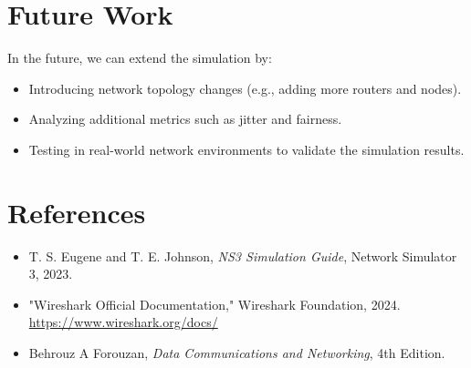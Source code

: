 \documentclass[a4paper,12pt]{article}
\begin{document}
	\section{Future Work}
	In the future, we can extend the simulation by:
	\begin{itemize}
		\item Introducing network topology changes (e.g., adding more routers and nodes).
		\item Analyzing additional metrics such as jitter and fairness.
		\item Testing in real-world network environments to validate the simulation results.
	\end{itemize}
	
	\section{References}
	\begin{itemize}
		\item T. S. Eugene and T. E. Johnson, \textit{NS3 Simulation Guide}, Network Simulator 3, 2023.
		\item "Wireshark Official Documentation," Wireshark Foundation, 2024. \url{https://www.wireshark.org/docs/}
		\item Behrouz A Forouzan, \textit{Data Communications and Networking}, 4th Edition.
	\end{itemize}
	
\end{document}
